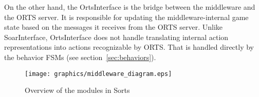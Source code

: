 \documentclass{article}
\begin{document}
On the other hand, the OrtsInterface is the bridge between the
middleware and the ORTS server. It is responsible for updating the
middleware-internal game state based on the messages it receives from
the ORTS server. Unlike SoarInterface, OrtsInterface does not handle
translating internal action representations into actions recognizable by
ORTS. That is handled directly by the behavior FSMs (see
section~\ref{sec:behaviors}).

\begin{figure}
\texttt{[image: graphics/middleware\_diagram.eps]}
\caption{Overview of the modules in Sorts}
\label{fig:SORTSOverview}
\end{figure}








\end{document}
